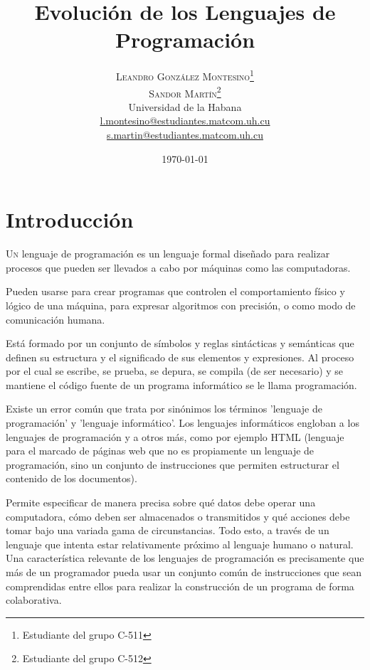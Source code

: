 \documentclass[twoside,twocolumn]{article}
\title{Evolución de los Lenguajes de Programación} %
\author{%
\textsc{Leandro González Montesino}\thanks{Estudiante del grupo C-511} \\[1ex] %
\textsc{Sandor Martín}\thanks{Estudiante del grupo C-512} \\[1ex]
\normalsize Universidad de la Habana \\ %
\normalsize \href{mailto:l.montesino@estudiantes.matcom.uh.cu}{l.montesino@estudiantes.matcom.uh.cu}\\ %
\normalsize \href{mailto:s.martin@estudiantes.matcom.uh.cu}{s.martin@estudiantes.matcom.uh.cu}
}
\date{\today} %
\begin{document}
\maketitle


\section{Introducción}

\lettrine[nindent=0em,lines=3]{U} n lenguaje de programación es un lenguaje formal diseñado para realizar procesos que pueden ser llevados a cabo por máquinas como las computadoras.

Pueden usarse para crear programas que controlen el comportamiento físico y lógico de una máquina, para expresar algoritmos con precisión, o como modo de comunicación humana.

Está formado por un conjunto de símbolos y reglas sintácticas y semánticas que definen su estructura y el significado de sus elementos y expresiones. Al proceso por el cual se escribe, se prueba, se depura, se compila (de ser necesario) y se mantiene el código fuente de un programa informático se le llama programación.

Existe un error común que trata por sinónimos los términos 'lenguaje de programación' y 'lenguaje informático'. Los lenguajes informáticos engloban a los lenguajes de programación y a otros más, como por ejemplo HTML (lenguaje para el marcado de páginas web que no es propiamente un lenguaje de programación, sino un conjunto de instrucciones que permiten estructurar el contenido de los documentos).

Permite especificar de manera precisa sobre qué datos debe operar una computadora, cómo deben ser almacenados o transmitidos y qué acciones debe tomar bajo una variada gama de circunstancias. Todo esto, a través de un lenguaje que intenta estar relativamente próximo al lenguaje humano o natural. Una característica relevante de los lenguajes de programación es precisamente que más de un programador pueda usar un conjunto común de instrucciones que sean comprendidas entre ellos para realizar la construcción de un programa de forma colaborativa.


\end{document}
